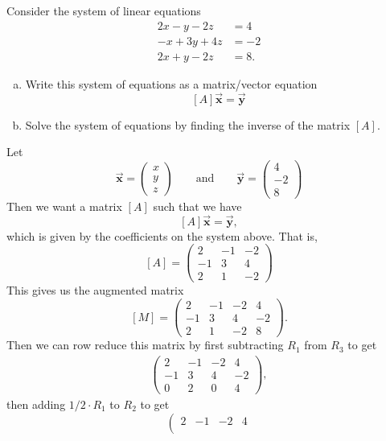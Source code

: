 \documentclass[12pt]{article} %
\newcommand{\vecx}{\boldsymbol{\vec{x}}}
\newcommand{\vecy}{\boldsymbol{\vec{y}}}
\begin{document}
\newpage
\begin{problem}
Consider the system of linear equations
\begin{align*}
    2x-y-2z&=4\\
    -x + 3y +4z &= -2\\
    2x+y-2z&=8.
\end{align*}
\begin{enumerate}[(a)]
    \item Write this system of equations as a matrix/vector equation
    \[
    [A]\vecx=\vecy
    \]
    \item Solve the system of equations by finding the inverse of the matrix $[A]$.
\end{enumerate}
\end{problem}
\begin{solution}
Let
\[
\vecx = \begin{pmatrix} x \\ y \\ z \end{pmatrix} \qquad \textrm{and} \qquad \vecy =\begin{pmatrix} 4 \\ -2 \\ 8\end{pmatrix}
\]
Then we want a matrix $[A]$ such that we have
\[
[A]\vecx = \vecy,
\]
which is given by the coefficients on the system above. That is,
\[
[A]=\begin{pmatrix} 2 & -1 & -2 \\ -1 & 3 & 4 \\ 2 & 1 & -2 \end{pmatrix}
\]
This gives us the augmented matrix
\[
[M] = \left( \begin{array}{ccc|c} 
    2 & -1 & -2 & 4\\
    -1 & 3 & 4 & -2\\
    2 & 1 & -2 & 8
\end{array}\right).
\]
Then we can row reduce this matrix by first subtracting $R_1$ from $R_3$ to get
\begin{align*}
    \left( \begin{array}{ccc|c} 
    2 & -1 & -2 & 4\\
    -1 & 3 & 4 & -2\\
    0 & 2 & 0 & 4
\end{array}\right),
\end{align*}
then adding $1/2\cdot R_1$ to $R_2$ to get
\[
\left( \begin{array}{ccc|c} 
    2 & -1 & -2 & 4\\

\end{array}\]
\end{solution}
\end{document}
